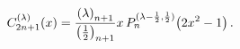 \[\mathop{C^{(\lambda)}_{2n+1}\/}\nolimits\!\left(x\right)=\frac{\left(\lambda%
\right)_{n+1}}{\left(\frac{1}{2}\right)_{n+1}}x\mathop{P^{(\lambda-\frac{1}{2}%
,\frac{1}{2})}_{n}\/}\nolimits\!\left(2x^{2}-1\right).\]